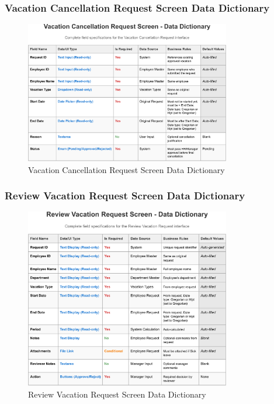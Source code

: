 \documentclass[12pt,a4paper]{article}
\begin{document}
\subsubsection{Vacation Cancellation Request Screen Data Dictionary}
\begin{figure}[H]
\centering
\includegraphics[width=0.8\textwidth]{Data-Dictionary/Screen-Data-Dictionaries/Vacation-Cancellation-Request-Screen-Data-Dictionary/Vacation-Cancellation-Request-Screen-Data-Dictionary-1.png}
\caption{Vacation Cancellation Request Screen Data Dictionary}
\label{fig:vacation-cancellation-data-dict}
\end{figure}

\subsubsection{Review Vacation Request Screen Data Dictionary}
\begin{figure}[H]
\centering
\includegraphics[width=0.8\textwidth]{Data-Dictionary/Screen-Data-Dictionaries/Review-Vacation-Request-Screen-Data-Dictionary/Review-Vacation-Request-Screen-Data-Dictionary-1.png}
\caption{Review Vacation Request Screen Data Dictionary}
\label{fig:review-vacation-data-dict}
\end{figure}
\end{document}
